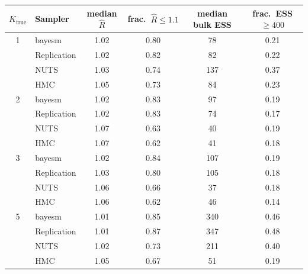 \begin{tabular}{clcccc}
\toprule
$K_{\text{true}}$ & Sampler & median $\widehat{R}$ & frac.\ $\widehat{R} \leq 1.1$ & median bulk ESS & frac.\ ESS $\geq 400$ \\
\midrule
1 & bayesm & 1.02 & 0.80 & 78 & 0.21 \\
 & Replication & 1.02 & 0.82 & 82 & 0.22 \\
 & NUTS & 1.03 & 0.74 & 137 & 0.37 \\
 & HMC & 1.05 & 0.73 & 84 & 0.23 \\
2 & bayesm & 1.02 & 0.83 & 97 & 0.19 \\
 & Replication & 1.02 & 0.83 & 74 & 0.17 \\
 & NUTS & 1.07 & 0.63 & 40 & 0.19 \\
 & HMC & 1.07 & 0.62 & 41 & 0.18 \\
3 & bayesm & 1.02 & 0.84 & 107 & 0.19 \\
 & Replication & 1.03 & 0.80 & 105 & 0.18 \\
 & NUTS & 1.06 & 0.66 & 37 & 0.18 \\
 & HMC & 1.06 & 0.62 & 46 & 0.14 \\
5 & bayesm & 1.01 & 0.85 & 340 & 0.46 \\
 & Replication & 1.01 & 0.87 & 347 & 0.48 \\
 & NUTS & 1.02 & 0.73 & 211 & 0.40 \\
 & HMC & 1.05 & 0.67 & 51 & 0.19 \\
\bottomrule
\end{tabular}
